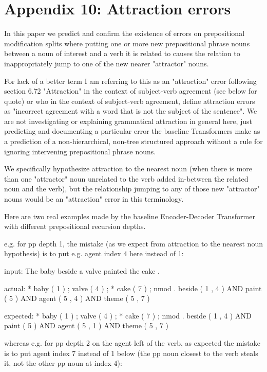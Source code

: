 \documentclass[11pt]{article}
\begin{document}
\section{Appendix 10: Attraction errors}
In this paper we predict and confirm the existence of errors on prepositional modification splits where putting one or more new prepositional phrase nouns between a noun of interest and a verb it is related to causes the relation to inappropriately jump to one of the new nearer "attractor" nouns. 

For lack of a better term I am referring to this as an "attraction" error following \cite{jespersen1913modernenglishgrammar1954reprint} section 6.72 "Attraction" in the context of subject-verb agreement (see below for quote) or \cite{FRANCK2006173} who in the context of subject-verb agreement, define attraction errors as "incorrect agreement with a word that is not the subject of the sentence". We are not investigating or explaining grammatical attraction in general here, just predicting and documenting a particular error the baseline Transformers make as a prediction of a non-hierarchical, non-tree structured approach without a rule for ignoring intervening prepositional phrase nouns. 

We specifically hypothesize attraction to the nearest noun (when there is more than one "attractor" noun unrelated to the verb added in-between the related noun and the verb), but the relationship jumping to any of those new "attractor" nouns would be an "attraction" error in this terminology.

Here are two real examples made by the \cite{Wu2023} baseline Encoder-Decoder Transformer with different prepositional recursion depths.

e.g. for pp depth 1, the mistake (as we expect from attraction to the nearest noun hypothesis) is to put e.g. agent index 4 here instead of 1:

input: The baby beside a valve painted the cake .

actual:   * baby ( 1 ) ; valve ( 4 ) ; * cake ( 7 ) ; nmod . beside ( 1 , 4 ) AND paint ( 5 ) AND agent ( 5 , 4 ) AND theme ( 5 , 7 )

expected: * baby ( 1 ) ; valve ( 4 ) ; * cake ( 7 ) ; nmod . beside ( 1 , 4 ) AND paint ( 5 ) AND agent ( 5 , 1 ) AND theme ( 5 , 7 )


whereas e.g. for pp depth 2 on the agent left of the verb, as expected the mistake is to put agent index 7 instead of 1 below (the pp noun closest to the verb steals it, not the other pp noun at index 4):
\end{document}
